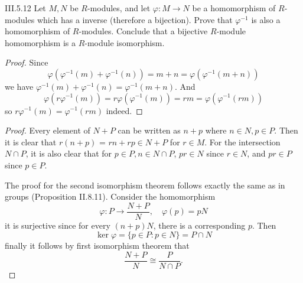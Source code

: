 \begin{problem}{III.5.12}
Let $M,N$ be $R$-modules, and let $\varphi:M \to N$ be a homomorphism of $R$-modules which has a inverse (therefore a bijection). Prove that $\varphi^{-1}$ is also a homomorphism of $R$-modules. Conclude that a bijective $R$-module homomorphism is a $R$-module isomorphism.
\end{problem}
\begin{proof}
Since
\[
\varphi(\varphi^{-1}(m) + \varphi^{-1}(n)) = m + n = \varphi(\varphi^{-1}(m + n))
\]
we have $\varphi^{-1}(m) + \varphi^{-1}(n) = \varphi^{-1}(m + n)$. And
\[
\varphi(r\varphi^{-1}(m)) = r\varphi(\varphi^{-1}(m)) = rm = \varphi(\varphi^{-1}(rm))
\]
so $r\varphi^{-1}(m) = \varphi^{-1}(rm)$ indeed. 
\end{proof}


\begin{proof}
Every element of $N+P$ can be written as $n+p$ where $n \in N, p \in P$. Then it is clear that $r(n+p)$ = $rn + rp \in N+P$ for $r \in M$. For the intersection $N \cap P$, it is also clear that for $p \in P, n \in N \cap P$, $pr \in N$ since $r \in N$, and $pr \in P$ since $p \in P$.

The proof for the second isomorphism theorem follows exactly the same as in groups (Proposition II.8.11). Consider the homomorphism
\[
\varphi: P \to \frac{N+P}{N}, \quad \varphi(p) = pN	
\]
it is surjective since for every $(n+p)N$, there is a corresponding $p$. Then
\[
\ker \varphi = \{p \in P : p \in N\} = P \cap N	
\]
finally it follows by first isomorphism theorem that 
\[
\frac{N+P}{N} \cong \frac{P}{N \cap P}.
\]
\end{proof}

\section{}

